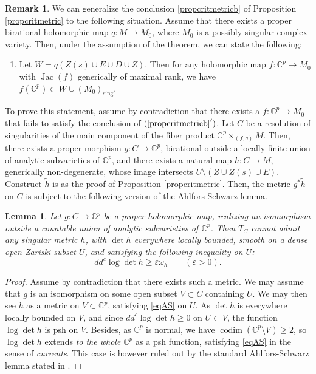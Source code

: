 \documentclass[JEP,XML,SOM,Unicode, NoEqCountersInSection,NoFloatCountersInSection,published]{cedram}
\let\epsilon\varepsilon
\newcommand{\sing}{\mathrm{sing}}
\DeclareMathOperator{\codim}{codim}
\DeclareMathOperator{\Jac}{Jac}
\theoremstyle{theorem}
\newtheorem{lemma}[proposition]{Lemma}
\theoremstyle{definition}
\newtheorem{remark}[proposition]{Remark}
\begin{document}
\begin{remark} \label{remCpsing} We can generalize the conclusion \eqref{propcritmetricb} of Proposition \ref{propcritmetric} to the following situation. Assume that there exists a proper birational holomorphic map $q : M \to M_0$, where $M_0$ is a possibly singular complex variety. Then, under the assumption of the theorem, we can state the following:

\begin{enumerate}
\item[$(\ref{propcritmetricb}')$]
Let $W = q( Z(s) \cup E \cup D \cup Z)$. Then for any holomorphic map $f : \mathbb C^p \to M_0$ with $\Jac(f)$ generically of maximal rank, we have $f(\mathbb C^p) \subset W \cup (M_0)_{\sing}$.
\end{enumerate}

To prove this statement, assume by contradiction that there exists a $f : \mathbb C^p \to M_0$ that fails to satisfy the conclusion of $(\ref{propcritmetricb}')$. Let $C$ be a resolution of singularities of the main component of the fiber product $\mathbb C^p \times_{(f, q)} M$. Then, there exists a proper morphism $g : C \to \mathbb C^p$, birational outside a locally finite union of analytic subvarieties of $\mathbb C^p$, and there exists a natural map $h : C \to M$, generically non-degenerate, whose image intersects $U \setminus (Z \cup Z(s) \cup E)$. Construct $\widetilde{h}$ is as the proof of Proposition \ref{propcritmetric}. Then, the metric $g^\ast \widetilde{h}$ on $C$ is subject to the following version of the Ahlfors-Schwarz lemma.
\end{remark}

\begin{lemma}
Let $g : C \to \mathbb C^p$ be a proper holomorphic map, realizing an isomorphism outside a countable union of analytic subvarieties of $\mathbb C^p$. Then $T_{C}$ cannot admit any singular metric $h$, with $\det h$ everywhere locally bounded, smooth on a dense open Zariski subset $U$, and satisfying the following inequality on $U$:
\begin{equation} \label{eqAS}
d d^c \log \det h \geq \epsilon \omega_h \hspace{2em} (\epsilon > 0).
\end{equation}
\end{lemma}
\begin{proof}
Assume by contradiction that there exists such a metric. We may assume that $g$ is an isomorphism on some open subset $V \subset C$ containing $U$. We may then see $h$ as a metric on $V \subset \mathbb C^p$, satisfying \eqref{eqAS} on $U$. As $\det h$ is everywhere locally bounded on $V$, and since $dd^c \log \det h \geq 0$ on $U \subset V$, the function $\log \det h$ is psh on $V$. Besides, as $\mathbb C^p$ is normal, we have $\codim (\mathbb C^p \setminus V) \geq 2$, so $\log \det h$ extends \emph{to the whole $\mathbb C^p$} as a psh function, satisfying \eqref{eqAS} in the sense of \emph{currents}. This case is however ruled out by the standard Ahlfors-Schwarz lemma stated in \cite{dem12a}.
\end{proof}
\end{document}
